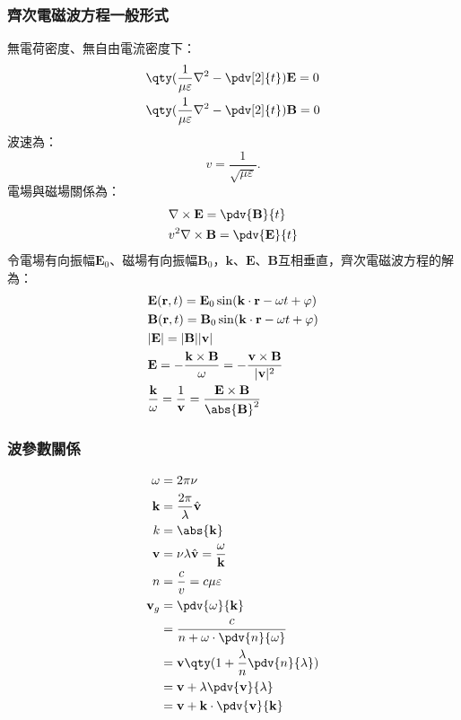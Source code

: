 \documentclass[a4paper,12pt]{report}
\begin{document}
\begin{itemize}
\subsubsection{齊次電磁波方程一般形式}
無電荷密度、無自由電流密度下：
\[\begin{aligned}
& \qty(\frac{1}{\mu\varepsilon}\nabla^2-\pdv[2]{t})\mathbf{E}=0\\
& \qty(\frac{1}{\mu\varepsilon}\nabla^2-\pdv[2]{t})\mathbf{B}=0
\end{aligned}\]
波速為：
\[v=\frac{1}{\sqrt{\mu\varepsilon}}.\]
電場與磁場關係為：
\[\begin{aligned}
&\nabla\times\mathbf{E}=\pdv{\mathbf{B}}{t}\\
&v^2\nabla\times\mathbf{B}=\pdv{\mathbf{E}}{t}
\end{aligned}\]
令電場有向振幅$\mathbf{E}_0$、磁場有向振幅$\mathbf{B}_0$，$\mathbf{k}$、$\mathbf{E}$、$\mathbf{B}$互相垂直，齊次電磁波方程的解為：
\[\begin{aligned}
&\mathbf{E}(\mathbf{r},t)=\mathbf{E}_0\sin(\mathbf{k}\cdot\mathbf{r}-\omega t+\varphi)\\
&\mathbf{B}(\mathbf{r},t)=\mathbf{B}_0\sin(\mathbf{k}\cdot\mathbf{r}-\omega t+\varphi)\\
&|\mathbf{E}|=|\mathbf{B}||\mathbf{v}|\\
&\mathbf{E}=-\frac{\mathbf{k}\times\mathbf{B}}{\omega}=-\frac{\mathbf{v}\times\mathbf{B}}{|\mathbf{v}|^2}\\
&\frac{\mathbf{k}}{\omega}=\frac{1}{\mathbf{v}}=\frac{\mathbf{E}\times\mathbf{B}}{\abs{\mathbf{B}}^2}
\end{aligned}\]
\subsubsection{波參數關係}
\[\begin{aligned}
\omega &= 2\pi \nu \\
\mathbf{k} &= \frac{2\pi}{\lambda}\hat{\mathbf{v}} \\
k &= \abs{\mathbf{k}} \\
\mathbf{v} &= \nu \lambda \hat{\mathbf{v}} = \frac{\omega}{\mathbf{k}}\\
n &= \frac{c}{v} = c\mu\varepsilon\\
\mathbf{v}_g &= \pdv{\omega}{\mathbf{k}} \\
&= \frac{c}{n+\omega\cdot \pdv{n}{\omega}} \\
&= \mathbf{v}\qty(1+\frac{\lambda}{n} \pdv{n}{\lambda}) \\
&= \mathbf{v}+\lambda \pdv{\mathbf{v}}{\lambda} \\
&= \mathbf{v}+\mathbf{k} \cdot\pdv{\mathbf{v}}{\mathbf{k}}
\end{aligned}\]

\end{itemize}
\end{document}
